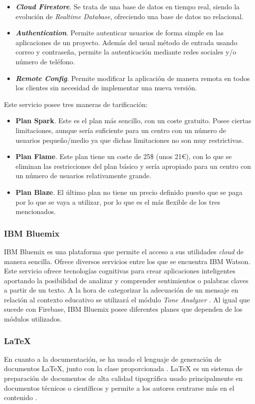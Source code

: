 \begin{itemize}
	\item \textbf{\textit{Cloud Firestore}}. Se trata de una base de datos en tiempo real, siendo la evolución de \textit{Realtime Database}, ofreciendo una base de datos no relacional.
	\item \textbf{\textit{Authentication}}. Permite autenticar usuarios de forma simple en las aplicaciones de un proyecto. Además del usual método de entrada usando correo y contraseña, permite la autenticación mediante redes sociales y/o número de teléfono.
	\item \textbf{\textit{Remote Config}}. Permite modificar la aplicación de manera remota en todos los clientes sin necesidad de implementar una nueva versión.
\end{itemize}

\clearpage

Este servicio posee tres maneras de tarificación:

\begin{itemize}
	\item \textbf{Plan Spark}. Este es el plan más sencillo, con un coste gratuito. Posee ciertas limitaciones, aunque sería suficiente para un centro con un número de usuarios pequeño/medio ya que dichas limitaciones no son muy restrictivas.
	\item \textbf{Plan Flame}. Este plan tiene un coste de 25\$ (unos 21\euro{}), con lo que se eliminan las restricciones del plan básico y sería apropiado para un centro con un número de usuarios relativamente grande.
	\item \textbf{Plan Blaze}. El último plan no tiene un precio definido puesto que se paga por lo que se vaya a utilizar, por lo que es el más flexible de los tres mencionados.
\end{itemize}

\subsubsection*{IBM Bluemix}
IBM Bluemix es una plataforma que permite el acceso a sus utilidades \textit{cloud} de manera sencilla. Ofrece diversos servicios entre los que se encuentra IBM Watson. Este servicio ofrece tecnologías cognitivas para crear aplicaciones inteligentes aportando la posibilidad de analizar y comprender sentimientos o palabras claves a partir de un texto. A la hora de categorizar la adecuación de un mensaje en relación al contexto educativo se utilizará el módulo \textit{Tone Analyzer} \cite{IBM}. Al igual que sucede con Firebase, IBM Bluemix posee diferentes planes que dependen de los módulos utilizados.

\subsubsection*{LaTeX}
En cuanto a la documentación, se ha usado el lenguaje de generación de documentos LaTeX, junto con la clase \esitfg{} proporcionada \cite{ARCO}. LaTeX es un sistema de preparación de documentos de alta calidad tipográfica usado principalmente en documentos técnicos o científicos y permite a los autores centrarse más en el contenido \cite{TheLatexProject}.